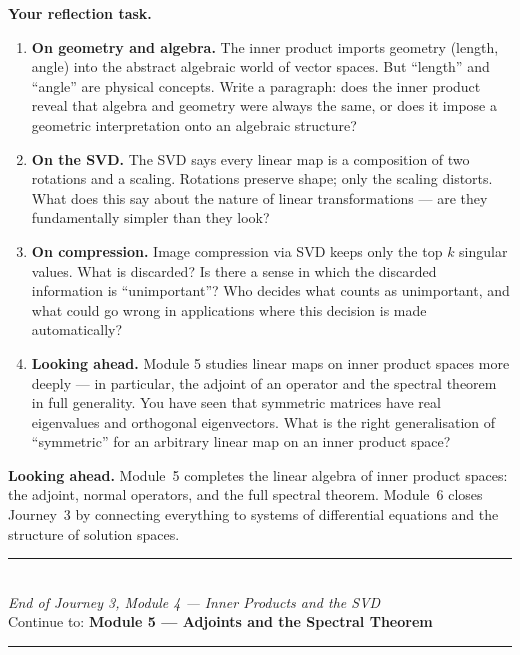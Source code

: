 \documentclass[12pt,a4paper]{article}
\begin{document}
\begin{reflectionbox}
\textbf{Your reflection task.}

\begin{enumerate}
  \item \textbf{On geometry and algebra.} The inner product imports geometry (length, angle) into the abstract algebraic world of vector spaces. But ``length'' and ``angle'' are physical concepts. Write a paragraph: does the inner product reveal that algebra and geometry were always the same, or does it impose a geometric interpretation onto an algebraic structure?

  \item \textbf{On the SVD.} The SVD says every linear map is a composition of two rotations and a scaling. Rotations preserve shape; only the scaling distorts. What does this say about the nature of linear transformations --- are they fundamentally simpler than they look?

  \item \textbf{On compression.} Image compression via SVD keeps only the top $k$ singular values. What is discarded? Is there a sense in which the discarded information is ``unimportant''? Who decides what counts as unimportant, and what could go wrong in applications where this decision is made automatically?

  \item \textbf{Looking ahead.} Module 5 studies linear maps on inner product spaces more deeply --- in particular, the adjoint of an operator and the spectral theorem in full generality. You have seen that symmetric matrices have real eigenvalues and orthogonal eigenvectors. What is the right generalisation of ``symmetric'' for an arbitrary linear map on an inner product space?
\end{enumerate}
\end{reflectionbox}

\medskip
\noindent\textbf{Looking ahead.}
Module~5 completes the linear algebra of inner product spaces: the adjoint, normal operators, and the full spectral theorem. Module~6 closes Journey~3 by connecting everything to systems of differential equations and the structure of solution spaces.

\vspace{1.4cm}
\begin{center}
{\color{MidBlue}\rule{0.5\linewidth}{0.8pt}}\\[6pt]
{\small\color{DarkGrey}\textit{End of Journey 3, Module 4 --- Inner Products and the SVD}}\\[4pt]
{\small\color{DarkGrey}Continue to: \textbf{Module 5 --- Adjoints and the Spectral Theorem}}\\[6pt]
{\color{MidBlue}\rule{0.5\linewidth}{0.8pt}}
\end{center}
\end{document}
